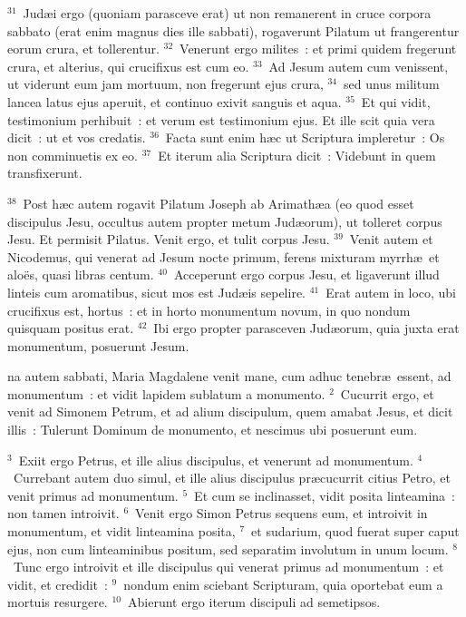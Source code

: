 ${}^{31}$~Jud\ae i ergo (quoniam parasceve erat) ut non remanerent in cruce corpora sabbato (erat enim magnus dies ille sabbati), rogaverunt Pilatum ut frangerentur eorum crura, et tollerentur.
${}^{32}$~Venerunt ergo milites~: et primi quidem fregerunt crura, et alterius, qui crucifixus est cum eo.
${}^{33}$~Ad Jesum autem cum venissent, ut viderunt eum jam mortuum, non fregerunt ejus crura,
${}^{34}$~sed unus militum lancea latus ejus aperuit, et continuo exivit sanguis et aqua.
${}^{35}$~Et qui vidit, testimonium perhibuit~: et verum est testimonium ejus. Et ille scit quia vera dicit~: ut et vos credatis.
${}^{36}$~Facta sunt enim h\ae c ut Scriptura impleretur~: Os non comminuetis ex eo.
${}^{37}$~Et iterum alia Scriptura dicit~: Videbunt in quem transfixerunt.


${}^{38}$~Post h\ae c autem rogavit Pilatum Joseph ab Arimath\ae a (eo quod esset discipulus Jesu, occultus autem propter metum Jud\ae orum), ut tolleret corpus Jesu. Et permisit Pilatus. Venit ergo, et tulit corpus Jesu.
${}^{39}$~Venit autem et Nicodemus, qui venerat ad Jesum nocte primum, ferens mixturam myrrh\ae\ et alo\"es, quasi libras centum.
${}^{40}$~Acceperunt ergo corpus Jesu, et ligaverunt illud linteis cum aromatibus, sicut mos est Jud\ae is sepelire.
${}^{41}$~Erat autem in loco, ubi crucifixus est, hortus~: et in horto monumentum novum, in quo nondum quisquam positus erat.
${}^{42}$~Ibi ergo propter parasceven Jud\ae orum, quia juxta erat monumentum, posuerunt Jesum.

\bchapter
{}na autem sabbati, Maria Magdalene venit mane, cum adhuc tenebr\ae\ essent, ad monumentum~: et vidit lapidem sublatum a monumento.
${}^{2}$~Cucurrit ergo, et venit ad Simonem Petrum, et ad alium discipulum, quem amabat Jesus, et dicit illis~: Tulerunt Dominum de monumento, et nescimus ubi posuerunt eum.


${}^{3}$~Exiit ergo Petrus, et ille alius discipulus, et venerunt ad monumentum.
${}^{4}$~Currebant autem duo simul, et ille alius discipulus pr\ae cucurrit citius Petro, et venit primus ad monumentum.
${}^{5}$~Et cum se inclinasset, vidit posita linteamina~: non tamen introivit.
${}^{6}$~Venit ergo Simon Petrus sequens eum, et introivit in monumentum, et vidit linteamina posita,
${}^{7}$~et sudarium, quod fuerat super caput ejus, non cum linteaminibus positum, sed separatim involutum in unum locum.
${}^{8}$~Tunc ergo introivit et ille discipulus qui venerat primus ad monumentum~: et vidit, et credidit~:
${}^{9}$~nondum enim sciebant Scripturam, quia oportebat eum a mortuis resurgere.
${}^{10}$~Abierunt ergo iterum discipuli ad semetipsos.


